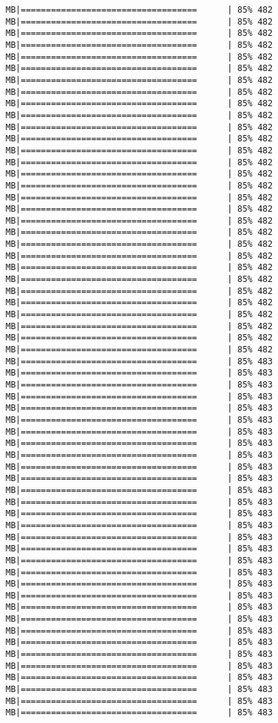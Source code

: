 \documentclass[
]{article}
\begin{document}
\begin{verbatim}
MB|===================================      | 85% 482 MB|===================================      | 85% 482 MB|===================================      | 85% 482 MB|===================================      | 85% 482 MB|===================================      | 85% 482 MB|===================================      | 85% 482 MB|===================================      | 85% 482 MB|===================================      | 85% 482 MB|===================================      | 85% 482 MB|===================================      | 85% 482 MB|===================================      | 85% 482 MB|===================================      | 85% 482 MB|===================================      | 85% 482 MB|===================================      | 85% 482 MB|===================================      | 85% 482 MB|===================================      | 85% 482 MB|===================================      | 85% 482 MB|===================================      | 85% 482 MB|===================================      | 85% 482 MB|===================================      | 85% 482 MB|===================================      | 85% 482 MB|===================================      | 85% 482 MB|===================================      | 85% 482 MB|===================================      | 85% 482 MB|===================================      | 85% 482 MB|===================================      | 85% 482 MB|===================================      | 85% 482 MB|===================================      | 85% 482 MB|===================================      | 85% 482 MB|===================================      | 85% 482 MB|===================================      | 85% 483 MB|===================================      | 85% 483 MB|===================================      | 85% 483 MB|===================================      | 85% 483 MB|===================================      | 85% 483 MB|===================================      | 85% 483 MB|===================================      | 85% 483 MB|===================================      | 85% 483 MB|===================================      | 85% 483 MB|===================================      | 85% 483 MB|===================================      | 85% 483 MB|===================================      | 85% 483 MB|===================================      | 85% 483 MB|===================================      | 85% 483 MB|===================================      | 85% 483 MB|===================================      | 85% 483 MB|===================================      | 85% 483 MB|===================================      | 85% 483 MB|===================================      | 85% 483 MB|===================================      | 85% 483 MB|===================================      | 85% 483 MB|===================================      | 85% 483 MB|===================================      | 85% 483 MB|===================================      | 85% 483 MB|===================================      | 85% 483 MB|===================================      | 85% 483 MB|===================================      | 85% 483 MB|===================================      | 85% 483 MB|===================================      | 85% 483 MB|===================================      | 85% 483 MB|===================================      | 85% 483 
\end{verbatim}
\end{document}

